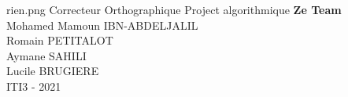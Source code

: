\documentclass[11pt,a4paper]{article}
\begin{document}
\PageDeGarde	
{rien.png} 
{Correcteur Orthographique} 
{Project algorithmique} 
{\textbf{Ze Team} \\
Mohamed Mamoun \textsc{IBN-ABDELJALIL}\\
Romain \textsc{PETITALOT}\\
Aymane \textsc{SAHILI}\\
Lucile \textsc{BRUGIERE}\\} 
{ITI3 - 2021}



\tableofcontents
\end{document}

